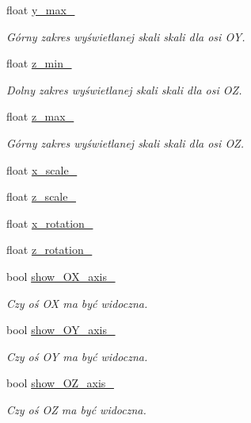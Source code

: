 \begin{DoxyCompactItemize}
float \hyperlink{class_pz_g_1_1_gnuplot_link_a9fb5609ee05da82c3a5c9f94416c1ac1}{y\+\_\+max\+\_\+}
\begin{DoxyCompactList}\small\item\em Górny zakres wyświetlanej skali skali dla osi {\itshape OY}. \end{DoxyCompactList}\item 
float \hyperlink{class_pz_g_1_1_gnuplot_link_a3a92421a06513241d150ec36eedcfb70}{z\+\_\+min\+\_\+}
\begin{DoxyCompactList}\small\item\em Dolny zakres wyświetlanej skali skali dla osi {\itshape OZ}. \end{DoxyCompactList}\item 
float \hyperlink{class_pz_g_1_1_gnuplot_link_ad16243c88647f80c0f69a6d04021dbf7}{z\+\_\+max\+\_\+}
\begin{DoxyCompactList}\small\item\em Górny zakres wyświetlanej skali skali dla osi {\itshape OZ}. \end{DoxyCompactList}\item 
float \hyperlink{class_pz_g_1_1_gnuplot_link_a725cf4ed098148a0e9b10ed94023757a}{x\+\_\+scale\+\_\+}
\item 
float \hyperlink{class_pz_g_1_1_gnuplot_link_a9926edcec6c7080a35f62c050f2773dc}{z\+\_\+scale\+\_\+}
\item 
float \hyperlink{class_pz_g_1_1_gnuplot_link_ae105dcd466bbc10f0b70ed753e0c2e4e}{x\+\_\+rotation\+\_\+}
\item 
float \hyperlink{class_pz_g_1_1_gnuplot_link_ae7ae9a0985b545d636908deb232f716c}{z\+\_\+rotation\+\_\+}
\item 
bool \hyperlink{class_pz_g_1_1_gnuplot_link_a694fd1200f95c4e8c1fcb0bfe30ab711}{show\+\_\+\+O\+X\+\_\+axis\+\_\+}
\begin{DoxyCompactList}\small\item\em Czy oś OX ma być widoczna. \end{DoxyCompactList}\item 
bool \hyperlink{class_pz_g_1_1_gnuplot_link_a6e6dbfa4c5d4ee81ef83afc1b4ad1be4}{show\+\_\+\+O\+Y\+\_\+axis\+\_\+}
\begin{DoxyCompactList}\small\item\em Czy oś OY ma być widoczna. \end{DoxyCompactList}\item 
bool \hyperlink{class_pz_g_1_1_gnuplot_link_a436e59363f312d5a98548526ced023ca}{show\+\_\+\+O\+Z\+\_\+axis\+\_\+}
\begin{DoxyCompactList}\small\item\em Czy oś OZ ma być widoczna. \end{DoxyCompactList}\end{DoxyCompactItemize}
